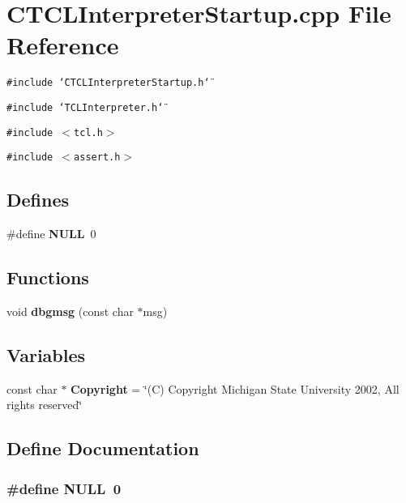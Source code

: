 \section{CTCLInterpreter\-Startup.cpp File Reference}
\label{CTCLInterpreterStartup_8cpp}
{\tt \#include \char`\"{}CTCLInterpreter\-Startup.h\char`\"{}}\par
{\tt \#include \char`\"{}TCLInterpreter.h\char`\"{}}\par
{\tt \#include $<$tcl.h$>$}\par
{\tt \#include $<$assert.h$>$}\par
\subsection*{Defines}
\begin{CompactItemize}
\item 
\#define {\bf NULL}\ 0
\end{CompactItemize}
\subsection*{Functions}
\begin{CompactItemize}
\item 
void {\bf dbgmsg} (const char $\ast$msg)
\end{CompactItemize}
\subsection*{Variables}
\begin{CompactItemize}
\item 
const char $\ast$ {\bf Copyright} = \char`\"{}(C) Copyright Michigan State University 2002, All rights reserved\char`\"{}
\end{CompactItemize}


\subsection{Define Documentation}
\subsubsection{\setlength{\rightskip}{0pt plus 5cm}\#define NULL\ 0}\label{CTCLInterpreterStartup_8cpp_a0}




